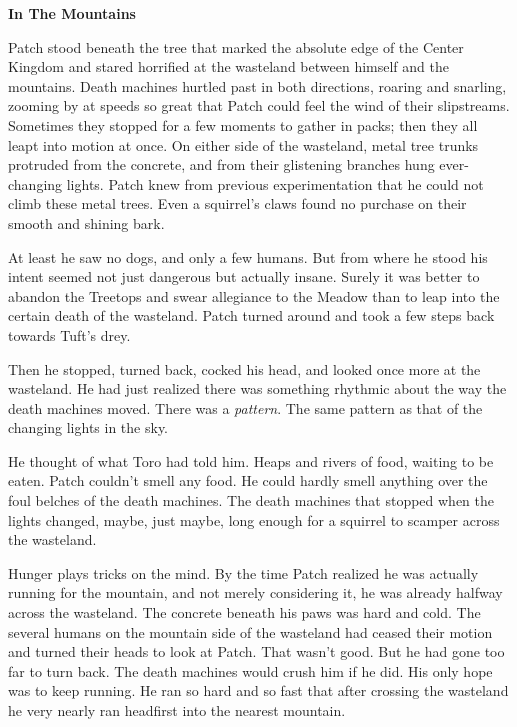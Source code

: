 \documentclass[11pt]{article}
\begin{document}
{\bf In The Mountains\par
\par
 Patch stood beneath the tree that marked the absolute edge of the Center Kingdom and stared horrified at the wasteland between himself and the mountains. Death machines hurtled past in both directions, roaring and snarling, zooming by at speeds so great that Patch could feel the wind of their slipstreams. Sometimes they stopped for a few moments to gather in packs; then they all leapt into motion at once. On either side of the wasteland, metal tree trunks protruded from the concrete, and from their glistening branches hung ever-changing lights. Patch knew from previous experimentation that he could not climb these metal trees. Even a squirrel's claws found no purchase on their smooth and shining bark.\par
 At least he saw no dogs, and only a few humans. But from where he stood his intent seemed not just dangerous but actually insane. Surely it was better to abandon the Treetops and swear allegiance to the Meadow than to leap into the certain death of the wasteland. Patch turned around and took a few steps back towards Tuft's drey.\par
 Then he stopped, turned back, cocked his head, and looked once more at the wasteland. He had just realized there was something rhythmic about the way the death machines moved. There was a {\it pattern}. The same pattern as that of the changing lights in the sky.\par
 He thought of what Toro had told him. Heaps and rivers of food, waiting to be eaten. Patch couldn't smell any food. He could hardly smell anything over the foul belches of the death machines. The death machines that stopped when the lights changed, maybe, just maybe, long enough for a squirrel to scamper across the wasteland.\par
 Hunger plays tricks on the mind. By the time Patch realized he was actually running for the mountain, and not merely considering it, he was already halfway across the wasteland. The concrete beneath his paws was hard and cold. The several humans on the mountain side of the wasteland had ceased their motion and turned their heads to look at Patch. That wasn't good. But he had gone too far to turn back. The death machines would crush him if he did. His only hope was to keep running. He ran so hard and so fast that after crossing the wasteland he very nearly ran headfirst into the nearest mountain.\par
}
\end{document}
